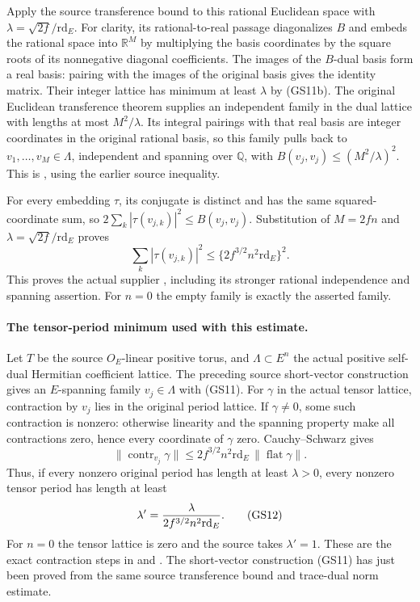 Apply the source transference bound to this rational Euclidean
space with \(\lambda=\sqrt{2f}/\mathrm{rd}_E\).
For clarity, its rational-to-real passage diagonalizes \(B\)
and embeds the rational space into \(\mathbb R^M\) by multiplying
the basis coordinates by the square roots of its nonnegative
diagonal coefficients.
The images of the \(B\)-dual basis form a real basis:
pairing with the images of the original basis gives the identity
matrix. Their integer lattice has minimum at least \(\lambda\)
by (GS11b). The original Euclidean transference theorem supplies
an independent family in the dual lattice with lengths at most
\(M^2/\lambda\). Its integral pairings with that real basis are
integer coordinates in the original rational basis, so this
family pulls back to \(v_1,\ldots,v_M\in\Lambda\), independent
and spanning over \(\mathbb Q\), with
\(B(v_j,v_j)\le(M^2/\lambda)^2\).
This is , using
the earlier source  inequality.

For every embedding \(\tau\), its conjugate is distinct and has
the same squared-coordinate sum, so
\(2\sum_k|\tau(v_{j,k})|^2\le B(v_j,v_j)\).
Substitution of \(M=2fn\) and \(\lambda=\sqrt{2f}/\mathrm{rd}_E\)
proves
\[
 \sum_k|\tau(v_{j,k})|^2
       \le\{2 f^{3/2}n^2\mathrm{rd}_E\}^2 .
 \tag{GS11}\label{eq:sr-source-tensor-short-vectors}
\]
This proves the actual supplier
, including
its stronger rational independence and spanning assertion.
For \(n=0\) the empty family is exactly the asserted family.

\paragraph{The tensor-period minimum used with this estimate.}
Let \(T\) be the source \(O_E\)-linear positive torus, and
\(\Lambda\subset E^n\) the actual positive self-dual Hermitian
coefficient lattice.
The preceding source short-vector construction gives an
\(E\)-spanning family \(v_j\in\Lambda\) with (GS11).
For \(\gamma\) in the actual tensor lattice, contraction by
\(v_j\) lies in the original period lattice.
If \(\gamma\ne0\), some such contraction is nonzero:
otherwise linearity and the spanning property make all
contractions zero, hence every coordinate of \(\gamma\) zero.
Cauchy--Schwarz gives
\[
 \|\operatorname{contr}_{v_j}\gamma\|
     \le2 f^{3/2}n^2\mathrm{rd}_E\,\|\operatorname{flat}\gamma\|.
\]
Thus, if every nonzero original period has length at least
\(\lambda>0\), every nonzero tensor period has length at least
\[
                  \lambda'={\lambda\over
                                     2f^{3/2}n^2\mathrm{rd}_E}.
 \tag{GS12}\label{eq:sr-source-tensor-period-minimum}
\]
For \(n=0\) the tensor lattice is zero and the source takes
\(\lambda'=1\).
These are the exact contraction steps in
and .
The short-vector construction (GS11) has just been proved from
the same source transference bound and trace-dual norm estimate.

